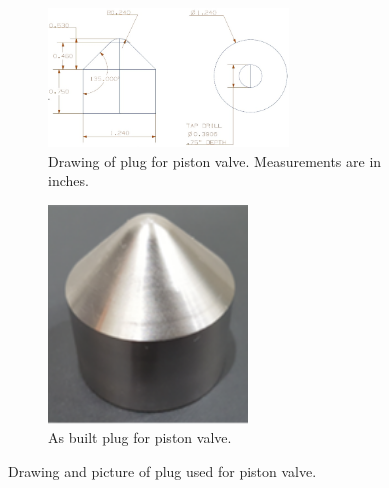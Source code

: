 \begin{figure}[bt]
    \vspace{16pt}
    \centering
    \begin{subfigure}[t]{0.6\textwidth}
        \centering
        \includegraphics[width=0.7\textwidth]{design/photos/plug_gen1_drawing.PNG}
        \caption{Drawing of plug for piston valve. Measurements are in inches.}
        \label{fig:plug draw}
    \end{subfigure}
    \hfill
    \begin{subfigure}[t]{0.35\textwidth}
        \centering
        \includegraphics[width=0.58\textwidth]{design/photos/cobalt_plug.png}
        \caption{As built plug for piston valve.}
        \label{fig:cobalt plug}
    \end{subfigure}
    \caption{Drawing and picture of plug used for piston valve.}
    \label{fig:plug}
    \vspace{16pt}
\end{figure}



